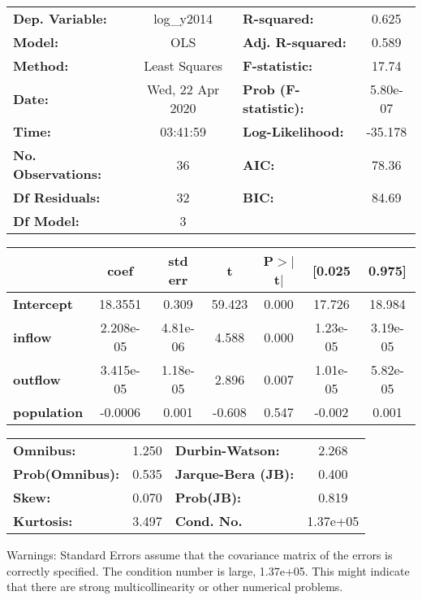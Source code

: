 \begin{center}
\begin{tabular}{lclc}
\toprule
\textbf{Dep. Variable:}    &    log\_y2014    & \textbf{  R-squared:         } &     0.625   \\
\textbf{Model:}            &       OLS        & \textbf{  Adj. R-squared:    } &     0.589   \\
\textbf{Method:}           &  Least Squares   & \textbf{  F-statistic:       } &     17.74   \\
\textbf{Date:}             & Wed, 22 Apr 2020 & \textbf{  Prob (F-statistic):} &  5.80e-07   \\
\textbf{Time:}             &     03:41:59     & \textbf{  Log-Likelihood:    } &   -35.178   \\
\textbf{No. Observations:} &          36      & \textbf{  AIC:               } &     78.36   \\
\textbf{Df Residuals:}     &          32      & \textbf{  BIC:               } &     84.69   \\
\textbf{Df Model:}         &           3      & \textbf{                     } &             \\
\bottomrule
\end{tabular}
\begin{tabular}{lcccccc}
                    & \textbf{coef} & \textbf{std err} & \textbf{t} & \textbf{P$> |$t$|$} & \textbf{[0.025} & \textbf{0.975]}  \\
\midrule
\textbf{Intercept}  &      18.3551  &        0.309     &    59.423  &         0.000        &       17.726    &       18.984     \\
\textbf{inflow}     &    2.208e-05  &     4.81e-06     &     4.588  &         0.000        &     1.23e-05    &     3.19e-05     \\
\textbf{outflow}    &    3.415e-05  &     1.18e-05     &     2.896  &         0.007        &     1.01e-05    &     5.82e-05     \\
\textbf{population} &      -0.0006  &        0.001     &    -0.608  &         0.547        &       -0.002    &        0.001     \\
\bottomrule
\end{tabular}
\begin{tabular}{lclc}
\textbf{Omnibus:}       &  1.250 & \textbf{  Durbin-Watson:     } &    2.268  \\
\textbf{Prob(Omnibus):} &  0.535 & \textbf{  Jarque-Bera (JB):  } &    0.400  \\
\textbf{Skew:}          &  0.070 & \textbf{  Prob(JB):          } &    0.819  \\
\textbf{Kurtosis:}      &  3.497 & \textbf{  Cond. No.          } & 1.37e+05  \\
\bottomrule
\end{tabular}
\end{center}

Warnings: \newline
 [1] Standard Errors assume that the covariance matrix of the errors is correctly specified. \newline
 [2] The condition number is large, 1.37e+05. This might indicate that there are \newline
 strong multicollinearity or other numerical problems.